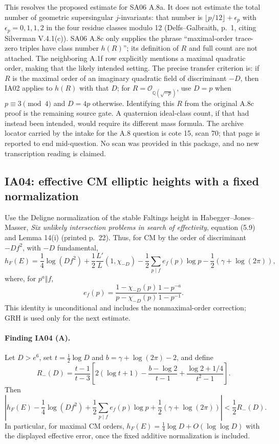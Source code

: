 \documentclass[11pt,a4paper]{article}
\theoremstyle{definition}
\begin{document}
This resolves the proposed estimate for SA06 A.8a.  It does not estimate
the total number of geometric supersingular $j$-invariants: that number
is $\lfloor p/12\rfloor+\epsilon_p$ with
$\epsilon_p=0,1,1,2$ in the four residue classes modulo 12
(Delfs--Galbraith, p.~1, citing Silverman V.4.1(c)).
SA06 A.8c only supplies the phrase ``maximal-order trace-zero triples
have class number $h(R)$''; its definition of $R$ and full count are not
attached.  The neighboring A.1f row explicitly mentions a maximal
quadratic order, making that the likely intended setting.  The precise
transfer criterion is: if $R$ is the maximal order of an imaginary
quadratic field of discriminant $-D$, then IA02 applies to $h(R)$ with
that $D$; for $R=\mathcal O_{\mathbb Q(\sqrt{-p})}$, use $D=p$
when $p\equiv3\pmod4$ and $D=4p$ otherwise.  Identifying this $R$
from the original A.8c proof is the remaining source gate.  A quaternion
ideal-class count, if that had instead been intended, would require its
different mass formula.
The archive locator carried by the intake for the A.8 question is cote
15, scan 70; that page is reported to end mid-question.  No scan was
provided in this package, and no new transcription reading is claimed.

\subsection{IA04: effective CM elliptic heights with a fixed normalization}

Use the Deligne normalization of the stable Faltings height in
Habegger--Jones--Masser, \emph{Six unlikely intersection problems in
search of effectivity}, equation (5.9) and Lemma 14(i) (printed p.~22).
Thus, for CM by the order of discriminant $-Df^2$, with $-D$ fundamental,
\[
 h_F(E)=\frac14\log(Df^2)+\frac12\frac{L'}L(1,\chi_{-D})
 -\frac12\sum_{p\mid f} e_f(p)\log p
 -\frac12(\gamma+\log(2\pi)),
\]
where, for $p^a\Vert f$,
\[
 e_f(p)=\frac{1-\chi_{-D}(p)}{p-\chi_{-D}(p)}
              \frac{1-p^{-a}}{1-p^{-1}}.
\]
This identity is unconditional and includes the nonmaximal-order
correction; GRH is used only for the next estimate.

\paragraph{Finding IA04 (A).}
Let $D>e^6$, set $t=\tfrac12\log D$ and
$b=\gamma+\log(2\pi)-2$, and define
\[
 R_-(D)=\frac{t-1}{t-3}\left[
 2(\log t+1)-\frac{b-\log2}{t-1}
             +\frac{\log2+1/4}{t^2-1}\right].
\]
Then
\[
 \left|h_F(E)-\frac14\log(Df^2)
       +\frac12\sum_{p\mid f}e_f(p)\log p
       +\frac12(\gamma+\log(2\pi))\right|
                    <\frac12R_-(D).
\]
In particular, for maximal CM orders,
$h_F(E)=\tfrac14\log D+O(\log\log D)$ with the displayed effective
error, once the fixed additive normalization is included.
\end{document}
